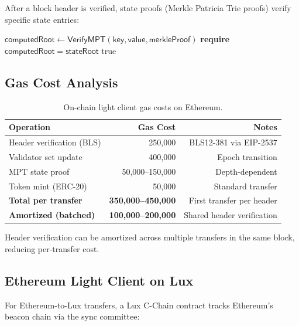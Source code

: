 \documentclass[11pt,a4paper]{article}
\begin{document}
After a block header is verified, state proofs (Merkle Patricia Trie proofs) verify specific state entries:

\begin{algorithm}[H]
\caption{State Proof Verification on Ethereum}
\label{alg:state_proof}
\begin{algorithmic}[1]
    \State $\mathsf{computedRoot} \gets \mathsf{VerifyMPT}(\mathsf{key}, \mathsf{value}, \mathsf{merkleProof})$
    \State \textbf{require} $\mathsf{computedRoot} = \mathsf{stateRoot}$
    \State \Return true
\EndProcedure
\end{algorithmic}
\end{algorithm}

\subsection{Gas Cost Analysis}

\begin{table}[H]
\centering
\caption{On-chain light client gas costs on Ethereum.}
\label{tab:lc_gas}
\begin{tabular}{lrr}
\toprule
\textbf{Operation} & \textbf{Gas Cost} & \textbf{Notes} \\
\midrule
Header verification (BLS) & 250,000 & BLS12-381 via EIP-2537 \\
Validator set update & 400,000 & Epoch transition \\
MPT state proof & 50,000--150,000 & Depth-dependent \\
Token mint (ERC-20) & 50,000 & Standard transfer \\
\midrule
\textbf{Total per transfer} & \textbf{350,000--450,000} & First transfer per header \\
\textbf{Amortized (batched)} & \textbf{100,000--200,000} & Shared header verification \\
\bottomrule
\end{tabular}
\end{table}

Header verification can be amortized across multiple transfers in the same block, reducing per-transfer cost.

\subsection{Ethereum Light Client on Lux}

For Ethereum-to-Lux transfers, a Lux C-Chain contract tracks Ethereum's beacon chain via the sync committee:
\end{document}
